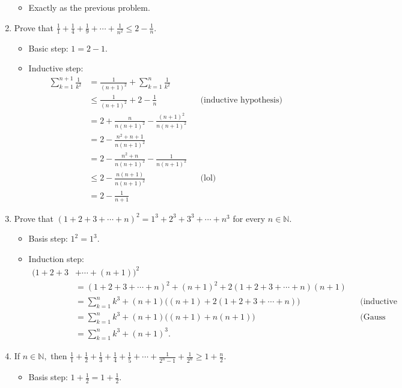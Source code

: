 \documentclass[11pt, oneside]{amsart}
\begin{document}
\begin{enumerate}
\begin{itemize}
\item Exactly as the previous problem.
\end{itemize}
\item Prove that \(\frac{1}{1} + \frac{1}{4} + \frac{1}{9} + \dotsb + \frac{1}{n^2} \leq 2 - \frac{1}{n}.\)
\label{sec:org2d1a669}
\begin{itemize}
\item Basic step: \(1 = 2 - 1.\)
\item Inductive step:
\begin{align*}
\sum_{k=1}^{n+1} \frac{1}{k^2} &= \frac{1}{(n+1)^2} + \sum_{k=1}^n \frac{1}{k^2} && \\
&\leq \frac{1}{(n+1)^2} + 2 - \frac{1}{n}  &&\text{(inductive hypothesis)} \\
&= 2 + \frac{n}{n(n+1)^2} - \frac{(n+1)^2}{n(n+1)^2} && \\
&= 2 - \frac{n^2+n+1}{n(n+1)^2}  && \\
&= 2 - \frac{n^2+n}{n(n+1)^2} - \frac{1}{n(n+1)^2} && \\
&\leq 2 - \frac{n(n+1)}{n(n+1)^2} &&\text{(lol)} \\
&= 2 - \frac{1}{n+1}  
\end{align*}
\end{itemize}
\item Prove that \((1+2+3+\dotsb+n)^2 = 1^3 + 2^3 + 3^3 + \dotsb + n^3\) for every \(n \in \mathbb{N}.\)
\label{sec:orga536c01}
\begin{itemize}
\item Basis step: \(1^2 = 1^3.\)
\item Induction step:
\begin{align*}
\big( 1+2+3 &+\dotsb+(n+1) \big)^2 && \\
&= (1+2+3+\dotsb+n)^2 + (n+1)^2 + 2(1+2+3+\dotsb+n)(n+1) && \\
&= \sum_{k=1}^n k^3 + (n+1)\big( (n+1) + 2(1+2+3+\dotsb+n) \big) &&\text{(inductive hypothesis)} \\
&= \sum_{k=1}^n k^3 + (n+1)\big( (n+1) + n(n+1) \big)   &&\text{(Gauss ftw)} \\
&= \sum_{k=1}^n k^3 + (n+1)^3.
\end{align*}
\end{itemize}
\item If \(n \in \mathbb{N},\) then \(\frac{1}{1} + \frac{1}{2} + \frac{1}{3} + \frac{1}{4} + \frac{1}{5} + \dotsb + \frac{1}{2^n -1} + \frac{1}{2^n} \geq 1 + \frac{n}{2}.\)
\label{sec:orgc917cca}
\begin{itemize}
\item Basis step: \(1+\frac{1}{2} = 1 + \frac{1}{2}.\)

\end{itemize}
\end{enumerate}
\end{document}
